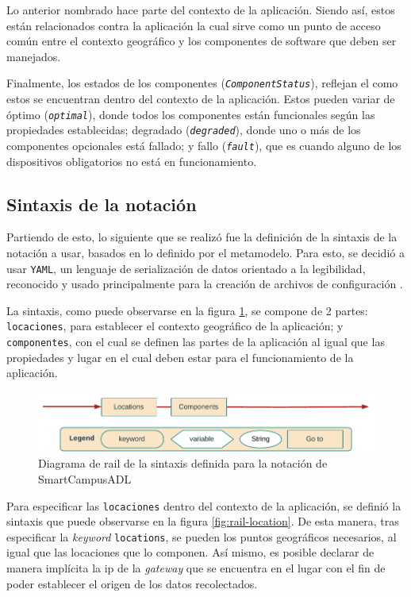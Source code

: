 Lo anterior nombrado hace parte del contexto de la aplicación. Siendo así, estos están relacionados contra la aplicación la cual sirve como un punto de acceso común entre el contexto geográfico y los componentes de software que deben ser manejados.

Finalmente, los estados de los componentes (\textit{\texttt{ComponentStatus}}), reflejan el como estos se encuentran dentro del contexto de la aplicación. Estos pueden variar de óptimo (\textit{\texttt{optimal}}), donde todos los componentes están funcionales según las propiedades establecidas; degradado (\textit{\texttt{degraded}}), donde uno o más de los componentes opcionales está fallado; y fallo (\textit{\texttt{fault}}), que es cuando alguno de los dispositivos obligatorios no está en funcionamiento.

\subsection{Sintaxis de la notación}

Partiendo de esto, lo siguiente que se realizó fue la definición de la sintaxis de la notación a usar, basados en lo definido por el metamodelo. Para esto, se decidió a usar \texttt{YAML}, un lenguaje de serialización de datos orientado a la legibilidad, reconocido y usado principalmente para la creación de archivos de configuración \cite{YAML2023}. 

La sintaxis, como puede observarse en la figura \ref{fig:rail-base}, se compone de 2 partes: \texttt{locaciones}, para establecer el contexto geográfico de la aplicación; y \texttt{componentes}, con el cual se definen las partes de la aplicación al igual que las propiedades y lugar en el cual deben estar para el funcionamiento de la aplicación.

\begin{figure}[H]
    \centering
    \caption{Diagrama de rail de la sintaxis definida para la notación de SmartCampusADL}
    \label{fig:rail-base}
    \vspace{2mm}
    \includegraphics[width=\linewidth]{images/Railroad Base.pdf}
\end{figure}

Para especificar las \texttt{locaciones} dentro del contexto de la aplicación, se definió la sintaxis que puede observarse en la figura \ref{fig:rail-location}. De esta manera, tras especificar la \textit{keyword} \texttt{locations}, se pueden los puntos geográficos necesarios, al igual que las locaciones que lo componen. Así mismo, es posible declarar de manera implícita la ip de la \textit{gateway} que se encuentra en el lugar con el fin de poder establecer el origen de los datos recolectados. 

